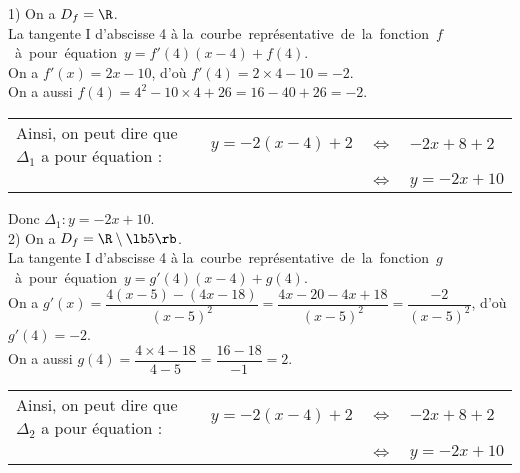 1) On a $D_f = \R$. \\ 

La tangente I d'abscisse 4 à \hbox{la courbe représentative de la fonction $f$ à pour équation $y = f'(4)(x-4) + f(4)$.} \\

On a $f'(x) = 2x - 10$, d'où $f'(4) = 2 \times 4 - 10 = -2$. \\

On a aussi $f(4) = 4^2 - 10 \times 4 + 26 = 16 - 40 + 26 = -2$.

\vspace*{.3cm}

\begin{tabular}{lrll}
\hspace{-.2cm} Ainsi, on peut dire que $\Delta_1$ a pour équation : & $y = -2\left(x-4\right) + 2$ & $\Longleftrightarrow$ & $-2x + 8 + 2$ \\
& & $\Longleftrightarrow$ & $y = -2x + 10$ \\
\end{tabular}

\vspace*{.3cm}

Donc $\Delta_1 : y = -2x + 10$. \\

2) On a $D_f = \R \setminus \lb 5 \rb$. \\ 

La tangente I d'abscisse 4 à \hbox{la courbe représentative de la fonction $g$ à pour équation $y = g'(4)(x-4) + g(4)$.} \\

On a $g'(x) = \dfrac{4\left(x-5\right)-\left(4x - 18\right)}{\left(x-5\right)^2} = \dfrac{4x - 20 - 4x + 18}{\left(x-5\right)^2} = \dfrac{-2}{\left(x-5\right)^2}$, d'où $g'(4) = -2$. \vspace*{.3cm}\\

On a aussi $g(4) = \dfrac{4 \times 4 - 18}{4 - 5} = \dfrac{16 - 18}{-1} = 2$.

\vspace*{.3cm}

\begin{tabular}{lrll}
\hspace{-.2cm} Ainsi, on peut dire que $\Delta_2$ a pour équation : & $y = -2\left(x-4\right) + 2$ & $\Longleftrightarrow$ & $-2x + 8 + 2$ \\
& & $\Longleftrightarrow$ & $y = -2x + 10$ \\
\end{tabular}

